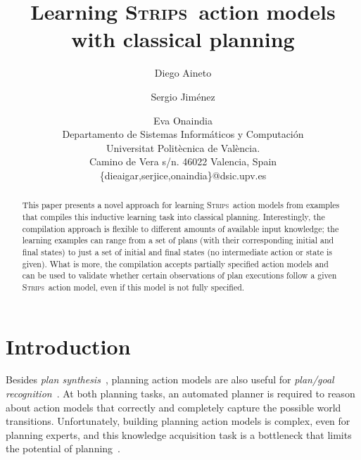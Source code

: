 \documentclass[letterpaper]{article} %
\newcommand{\strips}{\textsc{Strips}}     %
\begin{document}
\title{Learning \strips\ action models with classical planning}

\author{Diego Aineto\and Sergio Jim\'enez\and Eva Onaindia\\
{\small Departamento de Sistemas Inform\'aticos y Computaci\'on}\\
{\small Universitat Polit\`ecnica de Val\`encia.}\\
{\small Camino de Vera s/n. 46022 Valencia, Spain}\\
{\small \{dieaigar,serjice,onaindia\}@dsic.upv.es}}

\maketitle
\begin{abstract}
This paper presents a novel approach for learning \strips\ action models from examples that compiles this inductive learning task into classical planning. Interestingly, the compilation approach is flexible to different amounts of available input knowledge; the learning examples can range from a set of plans (with their corresponding initial and final states) to just a set of initial and final states (no intermediate action or state is given). What is more, the compilation accepts partially specified action models and can be used to validate whether certain observations of plan executions follow a given \strips\ action model, even if this model is not fully specified.
\end{abstract}


\section{Introduction}
Besides {\em plan synthesis}~\cite{ghallab2004automated,geffner:book:2013}, planning action models are also useful for {\em plan/goal recognition}~\cite{ramirez2012plan}. At both planning tasks, an automated planner is required to reason about action models that correctly and completely capture the possible world transitions. Unfortunately, building planning action models is complex, even for planning experts, and this knowledge acquisition task is a bottleneck that limits the potential of planning~\cite{kambhampati:modellite:AAAI2007}.
\end{document}
